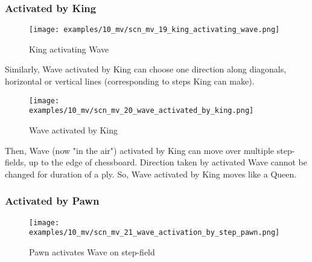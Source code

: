 \subsubsection*{Activated by King}
\label{sec:Miranda's veil/Wave/Movement/Activated by King}

\vspace*{-1.4\baselineskip}
\noindent
\begin{figure}[h]
\texttt{[image: examples/10\_mv/scn\_mv\_19\_king\_activating\_wave.png]}
\caption{King activating Wave}
\label{fig:scn_mv_19_king_activating_wave}
\end{figure}

Similarly, Wave activated by King can choose one direction along diagonals, horizontal
or vertical lines (corresponding to steps King can make).

\clearpage %

\vspace*{-2.1\baselineskip}
\noindent
\begin{figure}[!h]
\texttt{[image: examples/10\_mv/scn\_mv\_20\_wave\_activated\_by\_king.png]}
\caption{Wave activated by King}
\label{fig:scn_mv_20_wave_activated_by_king}
\end{figure}

Then, Wave (now "in the air") activated by King can move over multiple step-fields,
up to the edge of chessboard. Direction taken by activated Wave cannot be changed
for duration of a ply. So, Wave activated by King moves like a Queen.

\clearpage %

\subsubsection*{Activated by Pawn}
\label{sec:Miranda's veil/Wave/Movement/Activated by Pawn}

\vspace*{-1.5\baselineskip}
\noindent
\begin{figure}[!h]
\texttt{[image: examples/10\_mv/scn\_mv\_21\_wave\_activation\_by\_step\_pawn.png]}
\vspace*{-1.3\baselineskip}
\caption{Pawn activates Wave on step-field}
\label{fig:scn_mv_21_wave_activation_by_step_pawn}
\end{figure}

